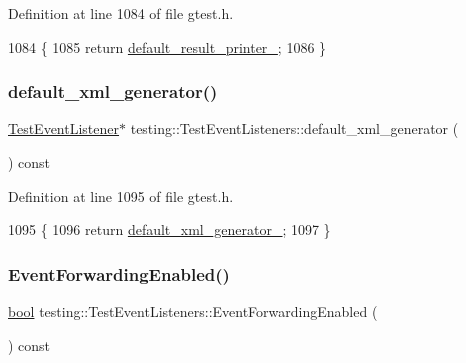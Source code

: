 Definition at line 1084 of file gtest.\+h.


\begin{DoxyCode}
1084                                                     \{
1085     \textcolor{keywordflow}{return} \hyperlink{classtesting_1_1TestEventListeners_a9ff9ebc31a9a52e5f108661cfcb7ecd9}{default\_result\_printer\_};
1086   \}
\end{DoxyCode}
\mbox{\label{classtesting_1_1TestEventListeners_aa880de6ddfc3f5824371853c6846abbd}} 
\subsubsection{\texorpdfstring{default\+\_\+xml\+\_\+generator()}{default\_xml\_generator()}}
{\footnotesize\ttfamily \hyperlink{classtesting_1_1TestEventListener}{Test\+Event\+Listener}$\ast$ testing\+::\+Test\+Event\+Listeners\+::default\+\_\+xml\+\_\+generator (\begin{DoxyParamCaption}{ }\end{DoxyParamCaption}) const\hspace{0.3cm}{\ttfamily [inline]}}



Definition at line 1095 of file gtest.\+h.


\begin{DoxyCode}
1095                                                    \{
1096     \textcolor{keywordflow}{return} \hyperlink{classtesting_1_1TestEventListeners_a018a3952aa10c19251b88f27abe373d3}{default\_xml\_generator\_};
1097   \}
\end{DoxyCode}
\mbox{\label{classtesting_1_1TestEventListeners_aa1878baf16a50f30f6435fad3c68ef3f}} 
\subsubsection{\texorpdfstring{Event\+Forwarding\+Enabled()}{EventForwardingEnabled()}}
{\footnotesize\ttfamily \hyperlink{classbool}{bool} testing\+::\+Test\+Event\+Listeners\+::\+Event\+Forwarding\+Enabled (\begin{DoxyParamCaption}{ }\end{DoxyParamCaption}) const\hspace{0.3cm}{\ttfamily [private]}}



